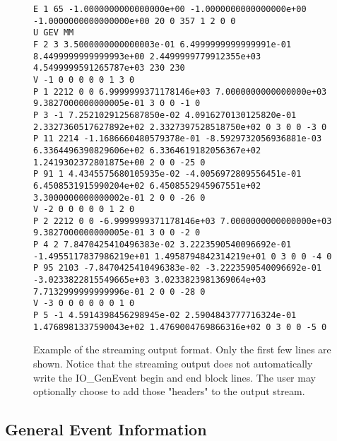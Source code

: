 \documentclass[11pt,letterpaper]{article}
\begin{document}
\begin{figure}[h]
  \begin{center}
{\tiny \begin{verbatim}
E 1 65 -1.0000000000000000e+00 -1.0000000000000000e+00 -1.0000000000000000e+00 20 0 357 1 2 0 0
U GEV MM
F 2 3 3.5000000000000003e-01 6.4999999999999991e-01 8.4499999999999993e+00 2.4499999779912355e+03 4.5499999591265787e+03 230 230
V -1 0 0 0 0 0 1 3 0
P 1 2212 0 0 6.9999999371178146e+03 7.0000000000000000e+03 9.3827000000000005e-01 3 0 0 -1 0
P 3 -1 7.2521029125687850e-02 4.0916270130125820e-01 2.3327360517627892e+02 2.3327397528518750e+02 0 3 0 0 -3 0
P 11 2214 -1.1686660480579378e-01 -8.5929732056936881e-03 6.3364496390829606e+02 6.3364619182056367e+02 1.2419302372801875e+00 2 0 0 -25 0
P 91 1 4.4345575680105935e-02 -4.0056972809556451e-01 6.4508531915990204e+02 6.4508552945967551e+02 3.3000000000000002e-01 2 0 0 -26 0
V -2 0 0 0 0 0 1 2 0
P 2 2212 0 0 -6.9999999371178146e+03 7.0000000000000000e+03 9.3827000000000005e-01 3 0 0 -2 0
P 4 2 7.8470425410496383e-02 3.2223590540096692e-01 -1.4955117837986219e+01 1.4958794842314219e+01 0 3 0 0 -4 0
P 95 2103 -7.8470425410496383e-02 -3.2223590540096692e-01 -3.0233822815549665e+03 3.0233823981369064e+03 7.7132999999999996e-01 2 0 0 -28 0
V -3 0 0 0 0 0 0 1 0
P 5 -1 4.5914398456298945e-02 2.5904843777716324e-01 1.4768981337590043e+02 1.4769004769866316e+02 0 3 0 0 -5 0
\end{verbatim}}
  \end{center}
  \caption[Example of ascii format]
          {\label{ascii_stream} Example of the streaming output format.
           Only the first few lines are shown. 
	   Notice that the streaming output does not automatically
	   write the IO\_GenEvent begin and end block lines.
	   The user may optionally choose to add those "headers" to the 
	   output stream. }
\end{figure}

\clearpage

%
%

\subsection{General Event Information}
\end{document}
